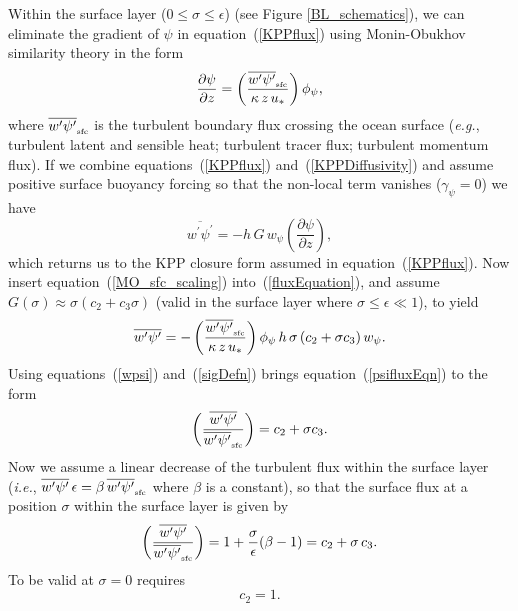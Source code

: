 \documentclass[preprint,12pt,authoryear]{agujournal}
\begin{document}
Within the surface layer ($0 \le \sigma \le \epsilon$) (see Figure \ref{BL_schematics}), we can eliminate the gradient of $\psi$ in equation~(\ref{KPPflux}) using Monin-Obukhov similarity theory in the form  
\begin{equation}
\label{MO_sfc_scaling}
\frac{\partial \psi}{\partial z} = 
\left( 
\frac{ \overline{w^\prime \psi^\prime}_{\mbox{\tiny sfc}}}{\kappa \, z \, u_*} 
\right)
\phi_\psi,
\end{equation}
where $\overline{w^\prime \psi^\prime}_{\mbox{\tiny sfc}}$ is the turbulent boundary flux crossing the ocean surface (\textit{e.g.}, turbulent latent and sensible heat; turbulent tracer flux; turbulent momentum flux). If we combine equations~(\ref{KPPflux}) and~(\ref{KPPDiffusivity}) and assume positive surface buoyancy forcing so that the non-local term vanishes ($\gamma_\psi = 0$) we have 
\begin{equation}
\label{fluxEquation}
\overline{w^\prime \psi^\prime} = -h \, G \, w_\psi \left( \frac{\partial \psi}{\partial z}\right),
\end{equation}
which returns us to the KPP closure form assumed in equation~(\ref{KPPflux}). Now insert equation~(\ref{MO_sfc_scaling}) into~(\ref{fluxEquation}), and assume $G(\sigma) \approx \sigma (c_2 + c_3 \sigma)$ (valid in the surface layer where $\sigma \le \epsilon \ll 1$), to yield 
\begin{equation}
\label{psifluxEqn}
\overline{w^\prime \psi^\prime} = 
-\left( 
\frac{\overline{w^\prime \psi^\prime}_{\mbox{\tiny sfc}}}{\kappa \, z \, u_*} \right)
 \phi_\psi \, h \, \sigma \, 
 (c_2 + \sigma c_3) \, w_\psi. 
\end{equation}
Using equations~(\ref{wpsi}) and~(\ref{sigDefn}) brings equation~(\ref{psifluxEqn}) to the form
\begin{equation}
\label{sfclayerrelation}
\left( \frac{\overline{w^\prime \psi^\prime}}{\overline{w^\prime \psi^\prime}_{\mbox{\tiny sfc}}}
 \right)
 = c_2 + \sigma c_3.
\end{equation}
Now we assume a linear decrease of the turbulent flux within the surface layer (\textit{i.e.}, $\overline{w^\prime \psi^\prime}\,\epsilon = \beta \, \overline{w^\prime \psi^\prime}_{\mbox{\tiny sfc}}$ where $\beta$ is a constant), so that the surface flux at a position $\sigma$ within the surface layer is given by
\begin{equation}
\label{fluxinsfclayer}
\left( \frac{\overline{w^\prime \psi^\prime}}{\overline{w^\prime \psi^\prime}_{\mbox{\tiny sfc}}}
 \right)
 = 1 + \frac{\sigma}{\epsilon} (\beta -1)
 = c_2 + \sigma \, c_3.
\end{equation}
To be valid at $\sigma = 0$ requires
\begin{equation}
c_2 = 1.
\end{equation}
\end{document}
